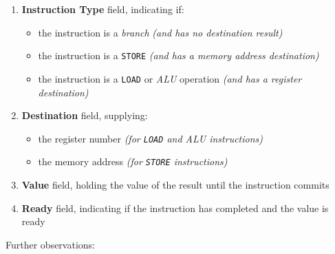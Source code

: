 \documentclass[english]{article}
\begin{document}
\begin{enumerate}
  \item \textbf{Instruction Type} field, indicating if:
        \begin{itemize}
          \item the instruction is a \textit{branch} \textit{(and has no destination result)}
          \item the instruction is a \texttt{STORE} \textit{(and has a memory address destination)}
          \item the instruction is a \texttt{LOAD} or \textit{ALU} operation \textit{(and has a register destination)}
        \end{itemize}
  \item \textbf{Destination} field, supplying:
        \begin{itemize}
          \item the register number \textit{(for \texttt{LOAD} and \textit{ALU} instructions)}
          \item the memory address \textit{(for \texttt{STORE} instructions)}
        \end{itemize}
  \item \textbf{Value} field, holding the value of the result until the instruction commits
  \item \textbf{Ready} field, indicating if the instruction has completed and the value is ready
\end{enumerate}

\bigskip
Further observations:
\end{document}

